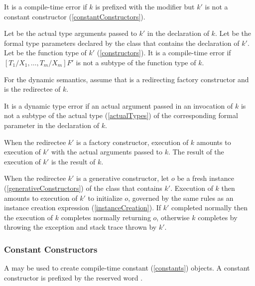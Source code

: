 \documentclass[makeidx]{article}
\begin{document}
\LMHash{}%
It is a compile-time error if $k$ is prefixed with the \CONST{} modifier
but $k'$ is not a constant constructor (\ref{constantConstructors}).

\LMHash{}%
Let  be the actual type arguments passed to $k'$
in the declaration of $k$.
Let  be the formal type parameters declared by
the class that contains the declaration of $k'$.
Let  be the function type of $k'$ (\ref{constructors}).
It is a compile-time error if $[T_1/X_1, \ldots, T_m/X_m]F'$
is not a subtype of the function type of $k$.


\LMHash{}%
For the dynamic semantics,
assume that  is a redirecting factory constructor
and  is the redirectee of $k$.

\LMHash{}%
It is a dynamic type error if an actual argument passed in an invocation of $k$
is not a subtype of the actual type (\ref{actualTypes})
of the corresponding formal parameter in the declaration of $k$.

\LMHash{}%
When the redirectee $k'$ is a factory constructor,
execution of $k$ amounts to execution of $k'$
with the actual arguments passed to $k$.
The result of the execution of $k'$ is the result of $k$.

\LMHash{}%
When the redirectee $k'$ is a generative constructor,
let $o$ be a fresh instance (\ref{generativeConstructors})
of the class that contains $k'$.
Execution of $k$ then amounts to execution of $k'$ to initialize $o$,
governed by the same rules as an instance creation expression
(\ref{instanceCreation}).
If $k'$ completed normally then the execution of $k$
completes normally returning $o$,
otherwise $k$ completes by throwing the exception and stack trace
thrown by $k'$.


\subsubsection{Constant Constructors}

\LMHash{}%
A 
may be used to create compile-time constant (\ref{constants}) objects.
A constant constructor is prefixed by the reserved word \CONST.
\end{document}

